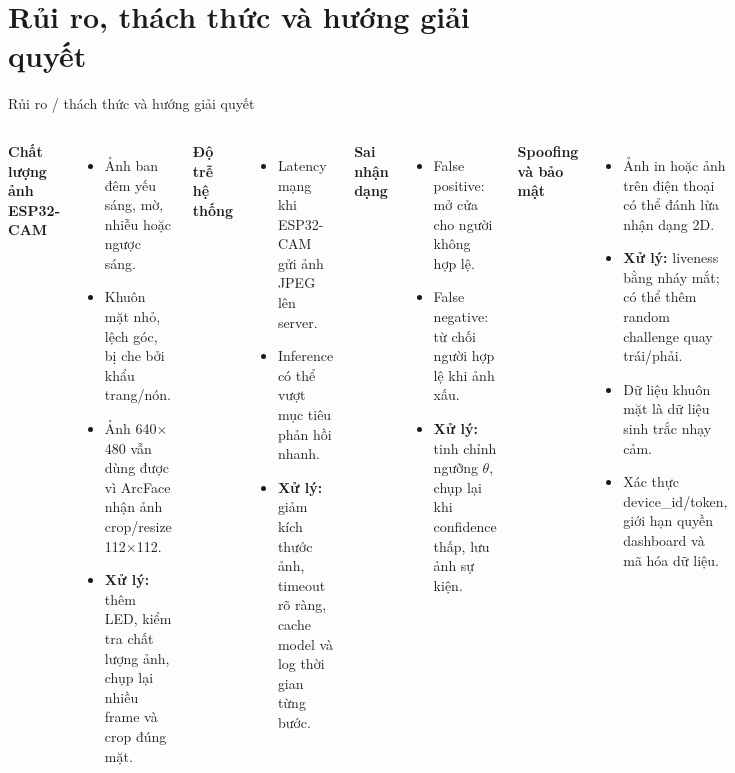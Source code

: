 \documentclass[aspectratio=169]{beamer}
\begin{document}
\section{Rủi ro, thách thức và hướng giải quyết}

\begin{frame}{Rủi ro / thách thức và hướng giải quyết}
  \scriptsize
  \begin{columns}[T]
      \textbf{Chất lượng ảnh ESP32-CAM}
      \begin{itemize}\setlength{\itemsep}{0.15em}
        \item Ảnh ban đêm yếu sáng, mờ, nhiễu hoặc ngược sáng.
        \item Khuôn mặt nhỏ, lệch góc, bị che bởi khẩu trang/nón.
        \item Ảnh 640$\times$480 vẫn dùng được vì ArcFace nhận ảnh crop/resize 112$\times$112.
        \item \textbf{Xử lý:} thêm LED, kiểm tra chất lượng ảnh, chụp lại nhiều frame và crop đúng mặt.
      \end{itemize}

      \vspace{0.25em}
      \textbf{Độ trễ hệ thống}
      \begin{itemize}\setlength{\itemsep}{0.15em}
        \item Latency mạng khi ESP32-CAM gửi ảnh JPEG lên server.
        \item Inference có thể vượt mục tiêu phản hồi nhanh.
        \item \textbf{Xử lý:} giảm kích thước ảnh, timeout rõ ràng, cache model và log thời gian từng bước.
      \end{itemize}

      \textbf{Sai nhận dạng}
      \begin{itemize}\setlength{\itemsep}{0.15em}
        \item False positive: mở cửa cho người không hợp lệ.
        \item False negative: từ chối người hợp lệ khi ảnh xấu.
        \item \textbf{Xử lý:} tinh chỉnh ngưỡng $\theta$, chụp lại khi confidence thấp, lưu ảnh sự kiện.
      \end{itemize}

      \vspace{0.25em}
      \textbf{Spoofing và bảo mật}
      \begin{itemize}\setlength{\itemsep}{0.15em}
        \item Ảnh in hoặc ảnh trên điện thoại có thể đánh lừa nhận dạng 2D.
        \item \textbf{Xử lý:} liveness bằng nháy mắt; có thể thêm random challenge quay trái/phải.
        \item Dữ liệu khuôn mặt là dữ liệu sinh trắc nhạy cảm.
        \item Xác thực device\_id/token, giới hạn quyền dashboard và mã hóa dữ liệu.
      \end{itemize}
  \end{columns}
\end{frame}
\end{document}
